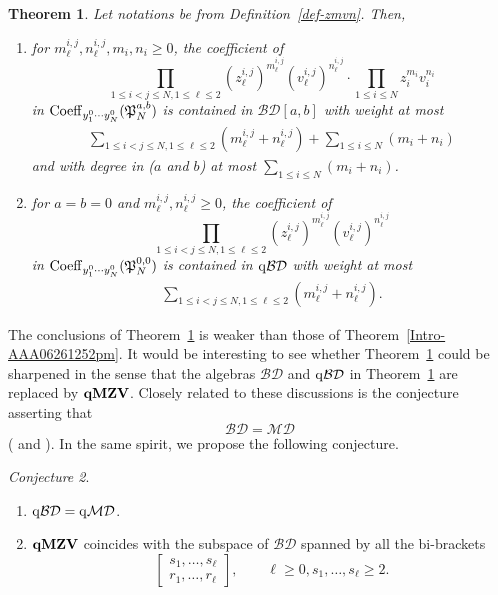 \documentclass[12pt, reqno]{amsart}
\newtheorem{theorem}{Theorem}[section]
\theoremstyle{definition}
\theoremstyle{remark}
\newtheorem{conjecture}[theorem]{Conjecture}
\numberwithin{equation}{section}
\newcommand{\BD}{\mathcal {BD}}
\newcommand{\Coe}{ {\rm Coeff} }
\newcommand{\qBD}{{\rm q}{\mathcal {BD}}}
\newcommand{\qMD}{{\rm q}{\mathcal {MD}}}
\newcommand{\qMZV}{ {\bf qMZV} }
\numberwithin{equation}{section}
\begin{document}
\begin{theorem}  \label{Intro-yij1toNm>0} 
Let notations be from Definition~\ref{def-zmvn}. Then,
\begin{enumerate}
\item[{\rm (i)}]
for $m_\ell^{i,j}, n_\ell^{i,j}, m_i, n_i \ge 0$, the coefficient of 
$$
\prod_{1 \le i < j \le N, 1 \le \ell \le 2} (z_\ell^{i,j})^{m_\ell^{i,j}}
(v_\ell^{i,j})^{n_\ell^{i,j}} \cdot \prod_{1 \le i \le N} 
z_i^{m_i} v_i^{n_i}
$$ 
in 
$
\Coe_{y_1^0 \cdots y_N^0}(\mathfrak P_{N}^{a,b})
$ 
is contained in $\BD[a, b]$ with weight at most 
\begin{eqnarray}    \label{Intro-yij1toNm>0.01}
\sum_{1 \le i < j \le N, 1 \le \ell \le 2} (m_\ell^{i,j} + n_\ell^{i,j})
+ \sum_{1 \le i \le N} (m_i + n_i)
\end{eqnarray}
and with degree in ($a$ and $b$) at most 
$
    \sum_{1 \le i \le N} (m_i + n_i)
$.

\item[{\rm (ii)}] 
for $a=b=0$ and $m_\ell^{i,j}, n_\ell^{i,j}\ge 0$, the coefficient of 
$$
\prod_{1 \le i < j \le N, 1 \le \ell \le 2} (z_\ell^{i,j})^{m_\ell^{i,j}}
(v_\ell^{i,j})^{n_\ell^{i,j}}
$$ 
in 
$
\Coe_{y_1^0 \cdots y_N^0}(\mathfrak P_{N}^{0,0})
$ 
is contained in $\qBD$ with weight at most 
\begin{eqnarray}    \label{Intro-yij1toNm>0.03}
\sum_{1 \le i < j \le N, 1 \le \ell \le 2} (m_\ell^{i,j} + n_\ell^{i,j}).
\end{eqnarray}
\end{enumerate}
\end{theorem}

The conclusions of Theorem~\ref{Intro-yij1toNm>0} is weaker than 
those of Theorem~\ref{Intro-AAA06261252pm}. It would be interesting to 
see whether Theorem~\ref{Intro-yij1toNm>0} could be sharpened 
in the sense that the algebras $\BD$ and $\qBD$ in 
Theorem~\ref{Intro-yij1toNm>0} are replaced by $\qMZV$. 
Closely related to these discussions is the conjecture asserting 
that 
$$
\BD = \mathcal {MD}
$$
(\cite[Conjecture~4.3]{Bac} and \cite[Conjecture~3.2~(B2)]{BK2}). 
In the same spirit, we propose the following conjecture. 

\begin{conjecture}   \label{Conj-Qin} 
\begin{enumerate}
\item[{\rm (i)}] $\qBD = \qMD$. 

\item[{\rm (ii)}] $\qMZV$ coincides with the subspace 
of $\BD$ spanned by all the bi-brackets
$$
\begin{bmatrix} s_1, \ldots, s_\ell\\r_1, \ldots, r_\ell \end{bmatrix},
\qquad \ell \ge 0, s_1, \ldots, s_\ell \ge 2.
$$
\end{enumerate}
\end{conjecture}
\end{document}
